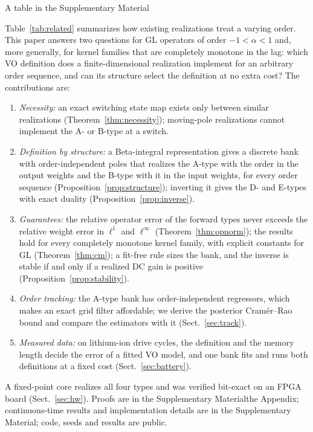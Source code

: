 \ifsp A table in the Supplementary Material\else

Table~\ref{tab:related}\fi{} summarizes how existing realizations treat a varying order. This paper answers two questions for GL operators of order $-1<\alpha<1$ and, more generally, for kernel families that are completely monotone in the lag: which VO definition does a finite-dimensional realization implement for an arbitrary order sequence, and can its structure select the definition at no extra cost? The contributions are:
\begin{enumerate}
\item \emph{Necessity:} an exact switching state map exists only between similar realizations (Theorem~\ref{thm:necessity}); moving-pole realizations cannot implement the A- or B-type at a switch.
\item \emph{Definition by structure:} a Beta-integral representation gives a discrete bank with order-independent poles that realizes the A-type with the order in the output weights and the B-type with it in the input weights, for every order sequence (Proposition~\ref{prop:structure}); inverting it gives the D- and E-types with exact duality (Proposition~\ref{prop:inverse}).
\item \emph{Guarantees:} the relative operator error of the forward types never exceeds the relative weight error in $\ell^1$ and $\ell^\infty$ (Theorem~\ref{thm:opnorm}); the results hold for every completely monotone kernel family, with explicit constants for GL (Theorem~\ref{thm:cm}); a fit-free rule sizes the bank, and the inverse is stable if and only if a realized DC gain is positive (Proposition~\ref{prop:stability}).
\item \emph{Order tracking:} the A-type bank has order-independent regressors, which makes an exact grid filter affordable; we derive the posterior Cram\'er--Rao bound and compare the estimators with it (Sect.~\ref{sec:track}).
\item \emph{Measured data:} on lithium-ion drive cycles, the definition and the memory length decide the error of a fitted VO model, and one bank fits and runs both definitions at a fixed cost (Sect.~\ref{sec:battery}).
\end{enumerate}
A fixed-point core realizes all four types and was verified bit-exact on an FPGA board (Sect.~\ref{sec:hw}). Proofs are in \ifsp the Supplementary Material\else the Appendix\fi; continuous-time results and implementation details are in the Supplementary Material; code, seeds and results are public.

